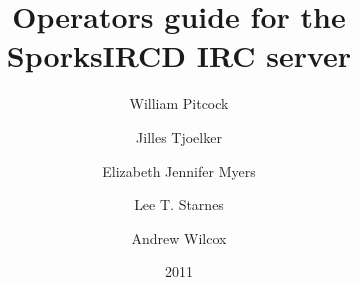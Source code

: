 \documentclass[11pt,letterpaper,twoside]{book}
\title{Operators guide for the SporksIRCD IRC server}
\author{William Pitcock \and Jilles Tjoelker \and Elizabeth Jennifer Myers \and
Lee T. Starnes \and Andrew Wilcox}
\date{2011}
\begin{document}
\label{sporksircd-oper-guide}

\def\DBKlegalblock{
\def\DBKlegaltitle{}
\begin{DBKlegalnotice}

 	Permission is granted to copy, distribute and/or modify this document
	under the terms of the GNU General Public License, Version 2 or any
	later version published by the Free Software Foundation
 
\end{DBKlegalnotice}
}
\maketitle
\tableofcontents










\end{document}
